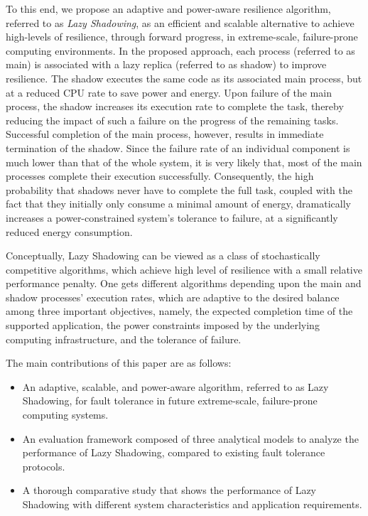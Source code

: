 To this end, we propose an adaptive and power-aware resilience algorithm, referred to as \textit{Lazy
Shadowing}, as an efficient and scalable alternative to achieve high-levels of resilience, through
forward progress, in extreme-scale, failure-prone computing environments. In the proposed
approach, each process (referred to as main) is associated with a lazy replica (referred to as shadow) to improve resilience. The shadow executes the same code as its
associated main process, but at a reduced CPU rate to save power and energy. %
Upon failure of the main process, the shadow increases its 
execution rate to complete the task, thereby reducing the impact of such a failure on the progress of
the remaining tasks. Successful completion of the main process, however, results in immediate
termination of the shadow. Since the failure rate of an individual component is much lower than that of 
the whole system, it is very likely that, most of the main processes complete their execution
successfully. %
Consequently, the high probability that shadows never have to complete the full task, coupled with the fact that 
they initially only consume a minimal amount of energy, 
dramatically increases a power-constrained system's tolerance to failure, at a significantly reduced
energy consumption.

Conceptually, Lazy Shadowing can be viewed as a class of stochastically competitive algorithms, which 
achieve high level of resilience with a small relative performance penalty.
One gets different algorithms depending upon the main and shadow processes' execution rates, which are adaptive to the desired balance among three important objectives, namely, the expected completion time of the supported application, the power constraints imposed by the underlying computing infrastructure, and the tolerance of failure. %

The main contributions of this paper are as follows:
\begin{itemize}
	\item An adaptive, scalable, and power-aware algorithm, referred to as Lazy Shadowing, for fault tolerance in future extreme-scale, failure-prone computing systems.
	\item An evaluation framework composed of three analytical models to analyze the performance of Lazy Shadowing, compared to existing fault tolerance protocols.
	\item A thorough comparative study that shows the performance of Lazy Shadowing with different system characteristics and application requirements.
\end{itemize}



